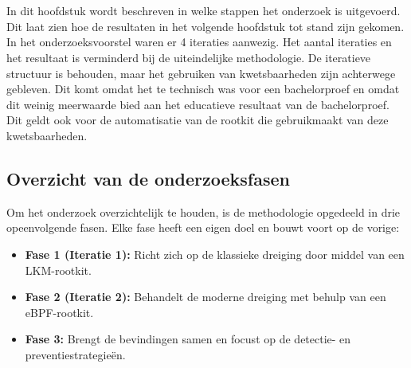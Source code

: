 
\chapter{}%
\label{ch:methodologie}

In dit hoofdstuk wordt beschreven in welke stappen het onderzoek is uitgevoerd. Dit laat zien hoe de resultaten in het volgende hoofdstuk tot stand zijn gekomen. In het onderzoeksvoorstel waren er 4 iteraties aanwezig. Het aantal iteraties en het resultaat is verminderd bij de uiteindelijke methodologie. De iteratieve structuur is behouden, maar het gebruiken van kwetsbaarheden zijn achterwege gebleven. Dit komt omdat het te technisch was voor een bachelorproef en omdat dit weinig meerwaarde bied aan het educatieve resultaat van de bachelorproef. Dit geldt ook voor de automatisatie van de rootkit die gebruikmaakt van deze kwetsbaarheden. 

\section{Overzicht van de onderzoeksfasen}
Om het onderzoek overzichtelijk te houden, is de methodologie opgedeeld in drie opeenvolgende fasen. Elke fase heeft een eigen doel en bouwt voort op de vorige:
\begin{itemize}
    \item \textbf{Fase 1 (Iteratie 1):} Richt zich op de klassieke dreiging door middel van een LKM-rootkit.
    \item \textbf{Fase 2 (Iteratie 2):} Behandelt de moderne dreiging met behulp van een eBPF-rootkit.
    \item \textbf{Fase 3:} Brengt de bevindingen samen en focust op de detectie- en preventiestrategieën.
\end{itemize}

